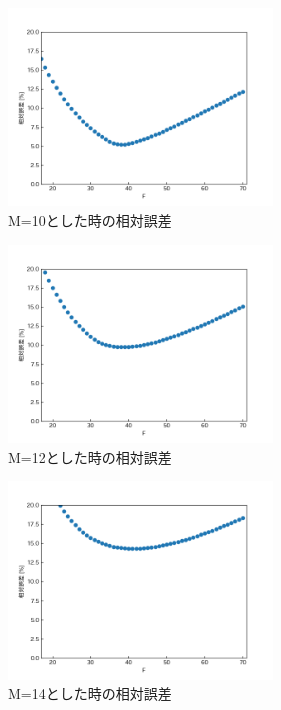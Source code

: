 \documentclass[12pt]{jsarticle}
\begin{document}
\begin{figure}[tb]
  \begin{center}
    \includegraphics[clip,width=7.0cm]{../img/M-10.png}
    \caption{M=10とした時の相対誤差}
    \label{Figure-M=10}
  \end{center}
\end{figure}
\begin{figure}[tb]
  \begin{center}
    \includegraphics[clip,width=7.0cm]{../img/M-12.png}
    \caption{M=12とした時の相対誤差}
    \label{Figure-M=12}
  \end{center}
\end{figure}
\begin{figure}[tb]
  \begin{center}
    \includegraphics[clip,width=7.0cm]{../img/M-14.png}
    \caption{M=14とした時の相対誤差}
    \label{Figure-M=14}
  \end{center}
\end{figure}
\end{document}
